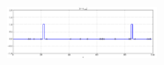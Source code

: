 \begin{multicols}{2}
\begin{figure}[H]
  \centering
		\includegraphics[width=0.4\textwidth]{images/results_new_normed.png}
\end{figure}

\end{multicols}





